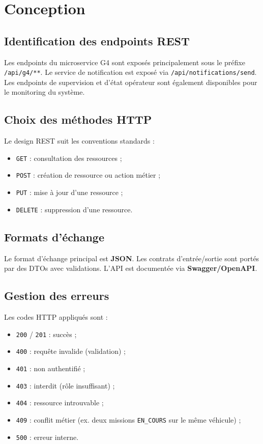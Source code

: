 \documentclass[12pt,a4paper]{report}
\begin{document}
\chapter{Conception}

\section{Identification des endpoints REST}
Les endpoints du microservice G4 sont exposés principalement sous le préfixe \texttt{/api/g4/**}.  
Le service de notification est exposé via \texttt{/api/notifications/send}.  
Les endpoints de supervision et d'état opérateur sont également disponibles pour le monitoring du système.

\section{Choix des méthodes HTTP}
Le design REST suit les conventions standards :
\begin{itemize}
    \item \texttt{GET} : consultation des ressources ;
    \item \texttt{POST} : création de ressource ou action métier ;
    \item \texttt{PUT} : mise à jour d'une ressource ;
    \item \texttt{DELETE} : suppression d'une ressource.
\end{itemize}

\section{Formats d'échange}
Le format d'échange principal est \textbf{JSON}.  
Les contrats d'entrée/sortie sont portés par des DTOs avec validations.  
L'API est documentée via \textbf{Swagger/OpenAPI}.

\section{Gestion des erreurs}
Les codes HTTP appliqués sont :
\begin{itemize}
    \item \texttt{200} / \texttt{201} : succès ;
    \item \texttt{400} : requête invalide (validation) ;
    \item \texttt{401} : non authentifié ;
    \item \texttt{403} : interdit (rôle insuffisant) ;
    \item \texttt{404} : ressource introuvable ;
    \item \texttt{409} : conflit métier (ex. deux missions \texttt{EN\_COURS} sur le même véhicule) ;
    \item \texttt{500} : erreur interne.
\end{itemize}
\end{document}
